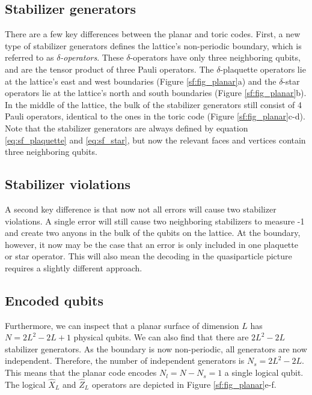 \subsection{Stabilizer generators}
There are a few key differences between the planar and toric codes. First, a new type of stabilizer generators defines the lattice's non-periodic boundary, which is referred to as \emph{$\delta$-operators}. These $\delta$-operators have only three neighboring qubits, and are the tensor product of three Pauli operators. The $\delta$-plaquette operators lie at the lattice's east and west boundaries (Figure \ref{sf:fig_planar}a) and the $\delta$-star operators lie at the lattice's north and south boundaries (Figure \ref{sf:fig_planar}b). In the middle of the lattice, the bulk of the stabilizer generators still consist of 4 Pauli operators, identical to the ones in the toric code (Figure \ref{sf:fig_planar}c-d). Note that the stabilizer generators are always defined by equation \eqref{eq:sf_plaquette} and \eqref{eq:sf_star}, but now the relevant faces and vertices contain three neighboring qubits.

\subsection{Stabilizer violations}
A second key difference is that now not all errors will cause two stabilizer violations. A single error will still cause two neighboring stabilizers to measure -1 and create two anyons in the bulk of the qubits on the lattice. At the boundary, however, it now may be the case that an error is only included in one plaquette or star operator. This will also mean the decoding in the quasiparticle picture requires a slightly different approach.

\subsection{Encoded qubits}
Furthermore, we can inspect that a planar surface of dimension $L$ has $N = 2L^2-2L+1$ physical qubits. We can also find that there are $2L^2-2L$ stabilizer generators. As the boundary is now non-periodic, all generators are now independent. Therefore, the number of independent generators is $N_s = 2L^2-2L$. This means that the planar code encodes $N_l = N-N_s = 1$ a single logical qubit. The logical $\hat{X}_L$ and $\hat{Z}_L$ operators are depicted in Figure \ref{sf:fig_planar}e-f.

